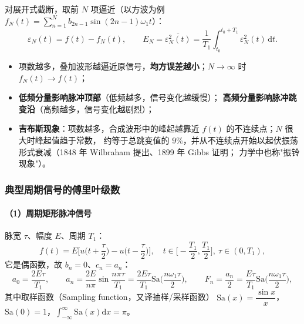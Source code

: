 对展开式截断，取前 $N$ 项逼近（以方波为例 $f_N(t)=\sum_{n=1}^{N}b_{2n-1}\sin(2n-1)\omega_1t$）：
\begin{equation}
\varepsilon_N(t)=f(t)-f_N(t),\qquad
E_N=\overline{\varepsilon_N^2(t)}=\frac{1}{T_1}\int_{t_0}^{t_0+T_1}\varepsilon_N^2(t)\,\mathrm{d}t .
\end{equation}
\begin{itemize}
\item 项数越多，叠加波形越逼近原信号，\textbf{均方误差越小}；$N\to\infty$ 时 $f_N(t)\to f(t)$；
\item \textbf{低频分量影响脉冲顶部}（低频越多，信号变化越缓慢）；
  \textbf{高频分量影响脉冲跳变沿}（高频越多，信号变化越剧烈）；
\item \textbf{吉布斯现象}：项数越多，合成波形中的峰起越靠近 $f(t)$ 的不连续点；$N$ 很大时峰起值趋于常数，
  约等于总跳变值的 $9\%$，并从不连续点开始以起伏振荡形式衰减（1848 年 Wilbraham 提出、1899 年 Gibbs 证明；
  力学中也称"振铃现象"）。
\end{itemize}

\subsubsection{典型周期信号的傅里叶级数}

\paragraph{（1）周期矩形脉冲信号}
脉宽 $\tau$、幅度 $E$、周期 $T_1$：
\begin{equation}
f(t)=E\Big[u\Big(t+\frac{\tau}{2}\Big)-u\Big(t-\frac{\tau}{2}\Big)\Big],\quad
t\in\Big[-\frac{T_1}{2},\frac{T_1}{2}\Big],\ \tau\in(0,T_1),
\end{equation}
它是偶函数，故 $b_n=0$、$c_n=a_n$：
\begin{equation}
a_0=\frac{2E\tau}{T_1},\qquad
a_n=\frac{2E}{n\pi}\sin\frac{n\pi\tau}{T_1}=\frac{2E\tau}{T_1}\mathrm{Sa}\Big(\frac{n\omega_1\tau}{2}\Big),\qquad
F_n=\frac{a_n}{2}=\frac{E\tau}{T_1}\mathrm{Sa}\Big(\frac{n\omega_1\tau}{2}\Big),
\end{equation}
其中取样函数（Sampling function，又译抽样/采样函数）
$\mathrm{Sa}(x)=\dfrac{\sin x}{x}$，$\mathrm{Sa}(0)=1$，$\displaystyle\int_{-\infty}^{\infty}\mathrm{Sa}(x)\mathrm{d}x=\pi$。

